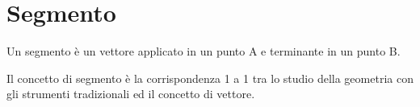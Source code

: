 \section{Segmento}
\begin{definizione}
Un segmento è un vettore applicato in un punto A e terminante in un punto B.
\end{definizione}

\begin{osservazione}
Il concetto di segmento è la corrispondenza 1 a 1 tra lo studio della geometria con gli strumenti tradizionali ed il concetto di vettore.
\end{osservazione}




